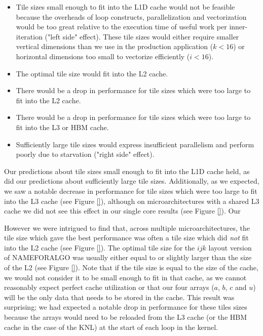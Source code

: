 \documentclass{sig-alternate-05-2015}
\begin{document}
\begin{itemize}
\item Tile sizes small enough to fit into the L1D cache would not be feasible
because the overheads of loop constructs, parallelization and vectorization
would be too great relative to the execution time of useful work per
inner-iteration ("left side" effect). These tile sizes would either require
smaller vertical dimensions than we use in the production application (\(k <
16\)) or horizontal dimensions too small to vectorize efficiently (\(i < 16\)).
\item The optimal tile size would fit into the L2 cache.
\item There would be a drop in performance for tile sizes which were too large to fit into the L2 cache.
\item There would be a drop in performance for tile sizes which were too large to fit into the L3 or HBM cache.
\item Sufficiently large tile sizes would express insufficient parallelism and
perform poorly due to starvation ("right side" effect).
\end{itemize}

Our predictions about tile sizes small enough to fit into the L1D cache held,
as did our predictions about sufficiently large tile sizes. Additionally, as we
expected, we saw a notable decrease in performance for tile sizes which were
too large to fit into the L3 cache (see Figure \ref{}), although on
microarchitectures with a shared L3 cache we did not see this effect in our
single core results (see Figure \ref{}). Our 

However we were intrigued to find that, across multiple microarchitectures, the
tile size which gave the best performance was often a tile size which did
\emph{not} fit into the L2 cache (see Figure \ref{}). The optimal tile size for
the \(ijk\) layout version of NAMEFORALGO was usually either equal to or
slightly larger than the size of the L2 (see Figure \ref{}). Note that if the
tile size is equal to the size of the cache, we would not consider it to be
small enough to fit in that cache, as we cannot reasonably expect perfect cache
utilization or that our four arrays (\(a\), \(b\), \(c\) and \(u\)) will be the
only data that needs to be stored in the cache. This result was surprising; we
had expected a notable drop in performance for these tiles sizes because the
arrays would need to be reloaded from the L3 cache (or the HBM cache in the
case of the KNL) at the start of each loop in the kernel. 
\end{document}
